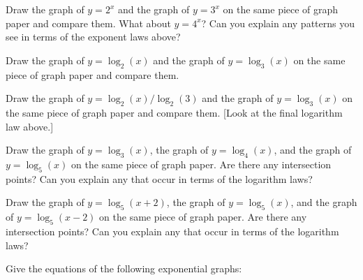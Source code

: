 \begin{questions}
  \question
    \begin{parts}
      \item Draw the graph of $ y = 2^x $ and the graph of $ y = 3^x $ on the same piece of graph paper and compare them. What about $ y = 4^x $? Can you explain any patterns you see in terms of the exponent laws above?
      \item Draw the graph of $ y = \log_2(x) $ and the graph of $ y = \log_3(x) $ on the same piece of graph paper and compare them.
      \item Draw the graph of $ y = \log_2(x)/\log_2(3) $ and the graph of $ y = \log_3(x) $ on the same piece of graph paper and compare them. [Look at the final logarithm law above.]
      \item Draw the graph of $ y = \log_3(x) $, the graph of $ y = \log_4(x) $, and the graph of $ y = \log_5(x) $ on the same piece of graph paper. Are there any
            intersection points? Can you explain any that occur in terms of the logarithm laws?
      \item Draw the graph of $ y = \log_5(x + 2) $, the graph of $ y = \log_5(x) $, and the graph of $ y = \log_5(x - 2) $ on the same piece of graph paper. Are there any
            intersection points? Can you explain any that occur in terms of the logarithm laws?
    \end{parts}
  \question Give the equations of the following exponential graphs:
    \begin{center}
    \quad
    \fbox{\begin{tikzpicture}

\end{tikzpicture}}
\end{center}
\end{questions}
